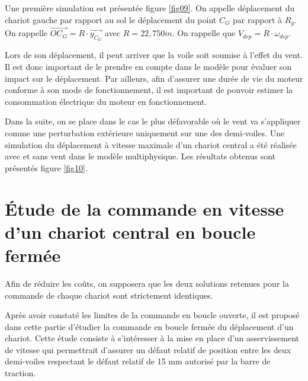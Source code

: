Une première simulation est présentée figure \ref{fig09}. On appelle déplacement du chariot gauche par rapport au sol le déplacement du point $C_G$ par rapport à $R_g$. On rappelle $\overrightarrow{OC_G}=R\cdot\overrightarrow{y_{C_G}}$ avec $R= 22,750m$. On rappelle que $V_{dep}=R\cdot\omega_{dep}$.



\newpage

Lors de son déplacement, il peut arriver que la voile soit soumise à l'effet du vent. Il est donc important de le prendre en compte dans le modèle pour évaluer son impact sur le déplacement. Par ailleurs, afin d'assurer une durée de vie du moteur conforme à son mode de fonctionnement, il est important de pouvoir estimer la consommation électrique du moteur en fonctionnement.

Dans la suite, on se place dans le cas le plus défavorable où le vent va s'appliquer comme une perturbation extérieure uniquement sur une des demi-voiles. Une simulation du déplacement à vitesse maximale d'un chariot central a été réalisée avec et sans vent dans le modèle multiphysique. Les résultats obtenus sont présentés figure \ref{fig10}.



\section{Étude de la commande en vitesse d'un chariot central en boucle fermée}

Afin de réduire les coûts, on supposera que les deux solutions retenues pour la commande de chaque chariot
sont strictement identiques.

Après avoir constaté les limites de la commande en boucle ouverte, il est proposé dans cette partie d'étudier la commande en boucle fermée du déplacement d'un chariot. Cette étude consiste à s'intéresser à la mise en place d'un asservissement de vitesse qui permettrait d'assurer un défaut relatif de position entre les deux demi-voiles respectant le défaut relatif de 15 mm autorisé par la barre de traction.

